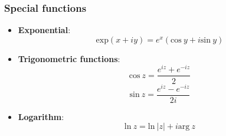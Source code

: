 \subsubsection{Special functions}
\begin{itemize}
\item \textbf{Exponential}: 
$$
\mathrm{exp}(x+iy) = e^x(\mathrm{cos}\ y + i\mathrm{sin}\ y)
$$
\item \textbf{Trigonometric functions}:
$$
\mathrm{cos}\ z = \frac{e^{iz}+e^{-iz}}{2} 
$$
$$
\mathrm{sin}\ z = \frac{e^{iz}-e^{-iz}}{2i} 
$$
\item \textbf{Logarithm}: 
$$
\mathrm{ln}\ z = \mathrm{ln}\ |z| + i\mathrm{arg}\ z
$$
\end{itemize}